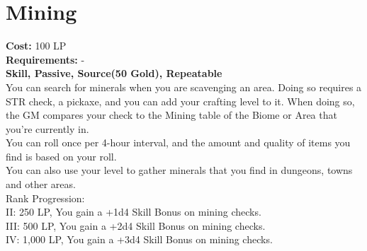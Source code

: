\section{Mining}\label{perk:mining}
\textbf{Cost:} 100 LP\\
\textbf{Requirements:} -\\
\textbf{Skill, Passive, Source(50 Gold), Repeatable}\\
You can search for minerals when you are scavenging an area.
Doing so requires a STR check, a pickaxe, and you can add your crafting level to it.
When doing so, the GM compares your check to the Mining table of the Biome or Area that you're currently in.\\
You can roll once per 4-hour interval, and the amount and quality of items you find is based on your roll.\\
You can also use your level to gather minerals that you find in dungeons, towns and other areas.
\\
Rank Progression:\\
II: 250 LP, You gain a +1d4 Skill Bonus on mining checks.\\
III: 500 LP, You gain a +2d4 Skill Bonus on mining checks.\\
IV: 1,000 LP, You gain a +3d4 Skill Bonus on mining checks.\\